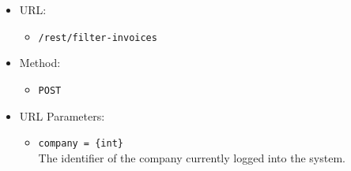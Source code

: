\begin{itemize}

    \item URL:
    \begin{itemize}
        \item \texttt{/rest/filter-invoices}
    \end{itemize}

    \item Method:
    \begin{itemize}
        \item \texttt{POST}
    \end{itemize}

    \item URL Parameters:
    \begin{itemize}
        \item \texttt{company = \{int\}} \\
        The identifier of the company currently logged into the system.
    \end{itemize}


\end{itemize}
